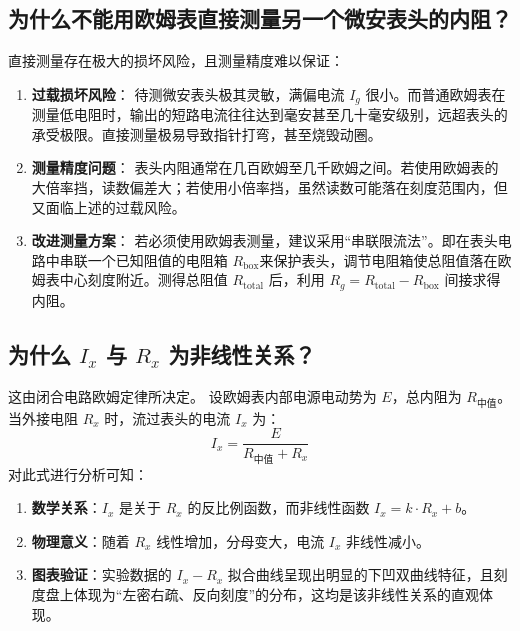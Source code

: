 \documentclass{../template/Report}%
\begin{document}
\begin{fullreportonly}
    \subsection{为什么不能用欧姆表直接测量另一个微安表头的内阻？}
    直接测量存在极大的损坏风险，且测量精度难以保证：
    \begin{enumerate}
        \item \textbf{过载损坏风险}：
              待测微安表头极其灵敏，满偏电流 $I_g$ 很小。而普通欧姆表在测量低电阻时，输出的短路电流往往达到毫安甚至几十毫安级别，远超表头的承受极限。直接测量极易导致指针打弯，甚至烧毁动圈。

        \item \textbf{测量精度问题}：
              表头内阻通常在几百欧姆至几千欧姆之间。若使用欧姆表的大倍率挡，读数偏差大；若使用小倍率挡，虽然读数可能落在刻度范围内，但又面临上述的过载风险。

        \item \textbf{改进测量方案}：
              若必须使用欧姆表测量，建议采用“串联限流法”。即在表头电路中串联一个已知阻值的电阻箱 $R_{\text{box}}$来保护表头，调节电阻箱使总阻值落在欧姆表中心刻度附近。测得总阻值 $R_{\text{total}}$ 后，利用 $R_g = R_{\text{total}} - R_{\text{box}}$ 间接求得内阻。
    \end{enumerate}

    \subsection{为什么 $I_x$ 与 $R_x$ 为非线性关系？}
    这由闭合电路欧姆定律所决定。
    设欧姆表内部电源电动势为 $E$，总内阻为 $R_{\text{中值}}$。当外接电阻 $R_x$ 时，流过表头的电流 $I_x$ 为：
    \begin{equation}
        I_x = \frac{E}{R_{\text{中值}} + R_x}
    \end{equation}
    对此式进行分析可知：
    \begin{enumerate}
        \item \textbf{数学关系}：$I_x$ 是关于 $R_x$ 的反比例函数，而非线性函数 $I_x = k \cdot R_x + b$。
        \item \textbf{物理意义}：随着 $R_x$ 线性增加，分母变大，电流 $I_x$ 非线性减小。
        \item \textbf{图表验证}：实验数据的 $I_x - R_x$ 拟合曲线呈现出明显的下凹双曲线特征，且刻度盘上体现为“左密右疏、反向刻度”的分布，这均是该非线性关系的直观体现。
    \end{enumerate}
\end{fullreportonly}
\insertnotes
\end{document}
